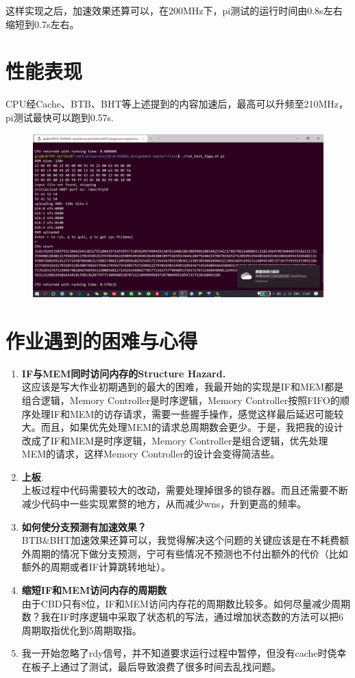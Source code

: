 \documentclass[a4paper,UTF8]{article}
\begin{document}
这样实现之后，加速效果还算可以，在200MHz下，pi测试的运行时间由0.8s左右缩短到0.7s左右。
\newpage
\section{性能表现}
CPU经Cache、BTB、BHT等上述提到的内容加速后，最高可以升频至210MHz，pi测试最快可以跑到0.57s.
\begin{figure}[h]
    \centering
	\includegraphics[width=1\linewidth]{5.png}
\end{figure}

\section{作业遇到的困难与心得}
\begin{enumerate}
    \item \textbf{IF与MEM同时访问内存的Structure Hazard.}\\
        这应该是写大作业初期遇到的最大的困难，我最开始的实现是IF和MEM都是组合逻辑，Memory Controller是时序逻辑，Memory Controller按照FIFO的顺序处理IF和MEM的访存请求，需要一些握手操作，感觉这样最后延迟可能较大。而且，如果优先处理MEM的请求总周期数会更少。于是，我把我的设计改成了IF和MEM是时序逻辑，Memory Controller是组合逻辑，优先处理MEM的请求，这样Memory Controller的设计会变得简洁些。
    \item \textbf{上板}.\\
    上板过程中代码需要较大的改动，需要处理掉很多的锁存器。而且还需要不断减少代码中一些实现累赘的地方，从而减少wns，升到更高的频率。
    \item \textbf{如何使分支预测有加速效果？}\\
    BTB\&BHT加速效果还算可以，我觉得解决这个问题的关键应该是在不耗费额外周期的情况下做分支预测，宁可有些情况不预测也不付出额外的代价（比如额外的周期或者IF计算跳转地址）。
    \item \textbf{缩短IF和MEM访问内存的周期数}\\
    由于CBD只有8位，IF和MEM访问内存花的周期数比较多。如何尽量减少周期数？我在IF时序逻辑中采取了状态机的写法，通过增加状态数的方法可以把6周期取指优化到5周期取指。
    \item 我一开始忽略了rdy信号，并不知道要求运行过程中暂停，但没有cache时侥幸在板子上通过了测试，最后导致浪费了很多时间去乱找问题。
\end{enumerate}
\end{document}
